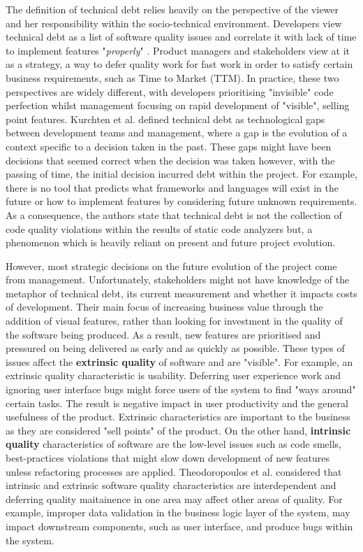 \documentclass{mprop}
\begin{document}
The definition of technical debt relies heavily on the perspective of the viewer
and her responsibility within the socio-technical environment. Developers view
technical debt as a list of software quality issues and correlate it with lack
of time to implement features "\textit{properly}" \cite{Codabux2013}. Product
managers and stakeholders view at it as a strategy, a way to defer quality work
for fast work in order to satisfy certain business requirements, such as Time to
Market (TTM). In practice, these two perspectives are widely different, with
developers prioritising "invisible" code perfection whilst management focusing
on rapid development of "visible", selling point features. Kurchten et al.
\cite{Kruchten2012} defined technical debt as technological gaps between
development teams and management, where a gap is the evolution of a context
specific to a decision taken in the past. These gaps might have been decisions
that seemed correct when the decision was taken however, with the passing of
time, the initial decision incurred debt within the project. For example, there
is no tool that predicts what frameworks and languages will exist in the future
or how to implement features by considering future unknown requirements. As a
consequence, the authors state that technical debt is not the collection of code
quality violations within the results of static code analyzers but, a phenomenon
which is heavily reliant on present and future project evolution.


However, most strategic decisions on the future evolution of the project come
from management. Unfortunately, stakeholders might not have knowledge of the
metaphor of technical debt, its current measurement and whether it impacts costs
of development. Their main focus of increasing business value through the
addition of visual features, rather than looking for investment in the quality
of the software being produced. As a result, new features are prioritised and
pressured on being delivered as early and as quickly as possible. These types of
issues affect the \textbf{extrinsic quality} of software and are "visible". For
example, an extrinsic quality characteristic is usability. Deferring user
experience work and ignoring user interface bugs might force users of the system
to find "ways around" certain tasks. The result is negative impact in user
productivity and the general usefulness of the product. Extrinsic
characteristics are important to the business as they are considered "sell
points" of the product. On the other hand, \textbf{intrinsic quality}
characteristics of software are the low-level issues such as code smells,
best-practices violations that might slow down development of new features
unless refactoring processes are applied. Theodoropoulos et al.
\cite{Theodoropoulos2011} considered that intrinsic and extrinsic software
quality characteristics are interdependent and deferring quality maitainence in
one area may affect other areas of quality. For example, improper data
validation in the business logic layer of the system, may impact downstream
components, such as user interface, and produce bugs within the system.
\end{document}
